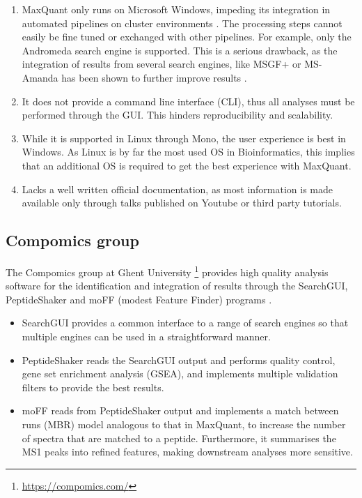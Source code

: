 \documentclass[11pt, a4paper]{report}
\begin{document}
\begin{enumerate}

\item MaxQuant only runs on Microsoft Windows, impeding its integration in automated pipelines on cluster environments \cite{Argentini2016}. The processing steps cannot easily be fine tuned or exchanged with other pipelines. For example, only the Andromeda search engine is supported. This is a serious drawback, as the integration of results from several search engines, like MSGF+ \cite{Kim2014} or MS-Amanda \cite{Dorfer2014}  has been shown to further improve results \cite{Shteynberg2013}.

\item It does not provide a command line interface (CLI), thus all analyses must be performed through the GUI. This hinders reproducibility and scalability.

\item While it is supported in Linux through Mono, the user experience is best in Windows. As Linux is by far the most used OS in Bioinformatics, this implies that an additional OS is required to get the best experience with MaxQuant.

\item Lacks a well written official documentation, as most information is made available only through talks published on Youtube or third party tutorials.

\end{enumerate}

\subsection{Compomics group}

The Compomics group at Ghent University \footnote{\href{https://compomics.com/}{https://compomics.com/}} provides high quality  analysis software for the identification and integration of results through the SearchGUI, PeptideShaker and moFF (modest Feature Finder) programs \cite{Barsnes2018} \cite{Vaudel2015} \cite{Argentini2016}.

\begin{itemize}

\item SearchGUI provides a common interface to a range of search engines so that multiple engines can be used in a straightforward manner.

\item PeptideShaker reads the SearchGUI output and performs quality control, gene set enrichment analysis (GSEA), and implements multiple validation filters to provide the best results.

\item moFF reads from PeptideShaker output and implements a match between runs (MBR) model analogous to that in MaxQuant, to increase the number of spectra that are matched to a peptide. Furthermore, it summarises the \ac{MS1} peaks into refined features, making downstream analyses more sensitive.

\end{itemize}
\end{document}
